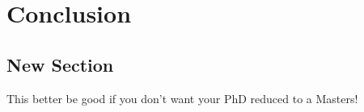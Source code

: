 
\chapter[CONCLUSION]{Conclusion} \label{concl}

\section{New Section}
This better be good if you don't want your PhD reduced to a Masters!
